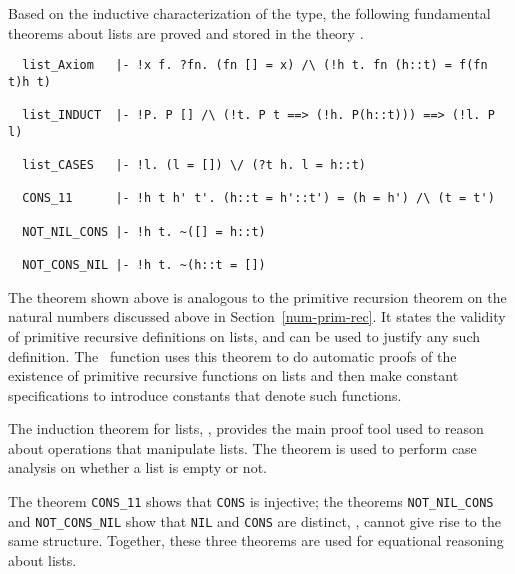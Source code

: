 Based on the inductive characterization of the type, the following
fundamental theorems about lists
are proved and stored in the theory .

\begin{hol}
{\small
\begin{verbatim}
  list_Axiom   |- !x f. ?fn. (fn [] = x) /\ (!h t. fn (h::t) = f(fn t)h t)

  list_INDUCT  |- !P. P [] /\ (!t. P t ==> (!h. P(h::t))) ==> (!l. P l)

  list_CASES   |- !l. (l = []) \/ (?t h. l = h::t)

  CONS_11      |- !h t h' t'. (h::t = h'::t') = (h = h') /\ (t = t')

  NOT_NIL_CONS |- !h t. ~([] = h::t)

  NOT_CONS_NIL |- !h t. ~(h::t = [])
\end{verbatim}
}
\end{hol}

The theorem  shown above is analogous to the primitive
recursion theorem
%
%
on the natural numbers discussed above in Section~\ref{num-prim-rec}.
It states the validity of primitive recursive definitions on lists,
and can be used to justify any such definition.  The \ML\ function
 uses this theorem to do
automatic
%
%
proofs of the existence of primitive recursive functions on lists and
then make constant specifications to introduce constants that denote
such functions.

The induction theorem for lists, , provides the main
proof tool used to reason about operations that manipulate lists. The
theorem  is used to perform case analysis on whether a
list is empty or not.

The theorem {\small\verb+CONS_11+} shows that {\small\verb+CONS+} is injective;
the theorems {\small\verb+NOT_NIL_CONS+} and {\small\verb+NOT_CONS_NIL+} show that
{\small\verb+NIL+} and {\small\verb+CONS+} are distinct, \ie,
cannot give rise to the same structure. Together, these three theorems
are used for equational reasoning about lists.

